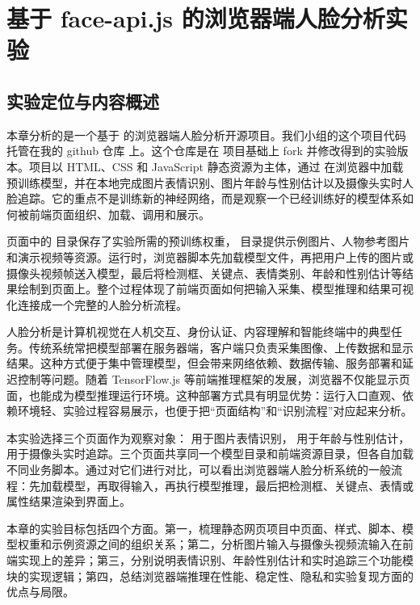 \section{基于 face-api.js 的浏览器端人脸分析实验}

\subsection{实验定位与内容概述}

本章分析的是一个基于  的浏览器端人脸分析开源项目。我们小组的这个项目代码托管在我的 github 仓库  上。这个仓库是在  项目基础上 fork 并修改得到的实验版本。项目以 HTML、CSS 和 JavaScript 静态资源为主体，通过 \cite{faceapi} 在浏览器中加载预训练模型，并在本地完成图片表情识别、图片年龄与性别估计以及摄像头实时人脸追踪。它的重点不是训练新的神经网络，而是观察一个已经训练好的模型体系如何被前端页面组织、加载、调用和展示。

页面中的  目录保存了实验所需的预训练权重， 目录提供示例图片、人物参考图片和演示视频等资源。运行时，浏览器脚本先加载模型文件，再把用户上传的图片或摄像头视频帧送入模型，最后将检测框、关键点、表情类别、年龄和性别估计等结果绘制到页面上。整个过程体现了前端页面如何把输入采集、模型推理和结果可视化连接成一个完整的人脸分析流程。

人脸分析是计算机视觉在人机交互、身份认证、内容理解和智能终端中的典型任务。传统系统常把模型部署在服务器端，客户端只负责采集图像、上传数据和显示结果。这种方式便于集中管理模型，但会带来网络依赖、数据传输、服务部署和延迟控制等问题。随着 TensorFlow.js 等前端推理框架的发展，浏览器不仅能显示页面，也能成为模型推理运行环境。这种部署方式具有明显优势：运行入口直观、依赖环境轻、实验过程容易展示，也便于把“页面结构”和“识别流程”对应起来分析。

本实验选择三个页面作为观察对象： 用于图片表情识别， 用于年龄与性别估计， 用于摄像头实时追踪。三个页面共享同一个模型目录和前端资源目录，但各自加载不同业务脚本。通过对它们进行对比，可以看出浏览器端人脸分析系统的一般流程：先加载模型，再取得输入，再执行模型推理，最后把检测框、关键点、表情或属性结果渲染到界面上。

本章的实验目标包括四个方面。第一，梳理静态网页项目中页面、样式、脚本、模型权重和示例资源之间的组织关系；第二，分析图片输入与摄像头视频流输入在前端实现上的差异；第三，分别说明表情识别、年龄性别估计和实时追踪三个功能模块的实现逻辑；第四，总结浏览器端推理在性能、稳定性、隐私和实验复现方面的优点与局限。

